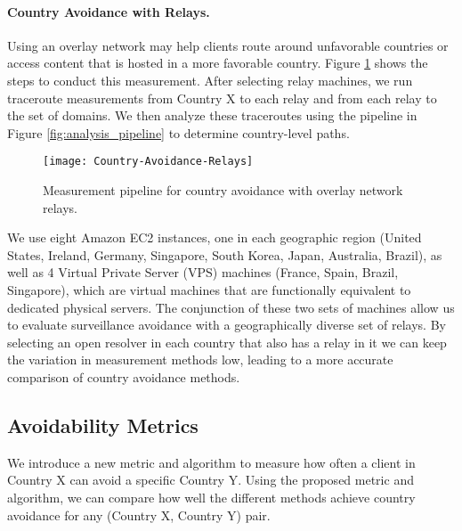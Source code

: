 \paragraph{Country Avoidance with Relays.} Using an overlay network may help clients route around unfavorable countries or access content that is hosted in a more favorable country.  Figure \ref{fig:avoidance_relays} shows the steps to conduct this measurement.  After selecting relay machines, we run traceroute measurements from Country X to each relay and from each relay to the set of domains. We then analyze these traceroutes using the pipeline in Figure \ref{fig:analysis_pipeline} to determine country-level paths.

\begin{figure}[t]
\centering
\texttt{[image: Country-Avoidance-Relays]}
\caption{Measurement pipeline for country avoidance with overlay network relays.}
\label{fig:avoidance_relays}
\end{figure}

We use eight Amazon EC2 instances, one in each geographic region (United States, Ireland, Germany, Singapore, South Korea, Japan, Australia, Brazil), as well as 4 Virtual Private Server (VPS) machines (France, Spain, Brazil, Singapore), which are virtual machines that are functionally equivalent to dedicated physical servers.  The conjunction of these two sets of machines allow us to evaluate surveillance avoidance with a geographically diverse set of relays. By selecting an open resolver in each country that also has a relay in it we can keep the variation in measurement methods low, leading to a more accurate comparison of country avoidance methods.

\subsection{Avoidability Metrics}
\label{metrics}
We introduce a new metric and algorithm to measure how often a client in Country X can avoid a specific Country Y.  Using the proposed metric and algorithm, we can compare how well the different methods achieve country avoidance for any (Country X, Country Y) pair.

